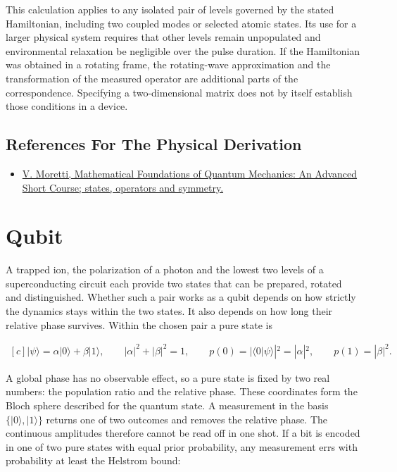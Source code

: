 \documentclass[11pt,oneside]{book}
\newenvironment{centeredalign}{\[\begin{gathered}[c]}{\end{gathered}\]}
\newcommand{\ket}[1]{\lvert #1\rangle}
\begin{document}
This calculation applies to any isolated pair of levels governed by the stated Hamiltonian, including two coupled modes or selected atomic states. Its use for a larger physical system requires that other levels remain unpopulated and environmental relaxation be negligible over the pulse duration. If the Hamiltonian was obtained in a rotating frame, the rotating-wave approximation and the transformation of the measured operator are additional parts of the correspondence. Specifying a two-dimensional matrix does not by itself establish those conditions in a device.

\subsection*{References For The Physical Derivation}
\begin{itemize}
\item \href{https://arxiv.org/abs/1508.06951}{V. Moretti, Mathematical Foundations of Quantum Mechanics: An Advanced Short Course; states, operators and symmetry.}
\end{itemize}





\clearpage

\section{Qubit}

\label{topic:qubit}

A trapped ion, the polarization of a photon and the lowest two levels of a superconducting circuit each provide two states that can be prepared, rotated and distinguished. Whether such a pair works as a qubit depends on how strictly the dynamics stays within the two states. It also depends on how long their relative phase survives. Within the chosen pair a pure state is

\begin{centeredalign}
\ket\psi=\alpha\ket0+\beta\ket1,\qquad |\alpha|^2+|\beta|^2=1,\qquad
p(0)=|\langle0|\psi\rangle|^2=|\alpha|^2,\qquad p(1)=|\beta|^2.
\end{centeredalign}

A global phase has no observable effect, so a pure state is fixed by two real numbers: the population ratio and the relative phase. These coordinates form the Bloch sphere described for the quantum state. A measurement in the basis \(\{\ket0,\ket1\}\) returns one of two outcomes and removes the relative phase. The continuous amplitudes therefore cannot be read off in one shot. If a bit is encoded in one of two pure states with equal prior probability, any measurement errs with probability at least the Helstrom bound:
\end{document}
